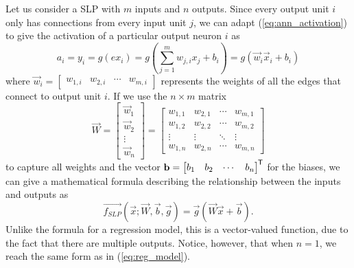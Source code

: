 Let us consider a SLP with $m$ inputs and $n$ outputs. 
Since every output unit $i$ only has connections from every input unit $j$,
we can adapt (\ref{eq:ann_activation}) to give the activation of a particular output neuron $i$ as
\begin{equation}
    a_i = y_i = g\left({ex}_i\right) = g\left(\sum_{j=1}^m{w_{j,i} x_j} + b_i\right)
    = g\left( \vec{w}_i \vec{x}_i + b_i\right)
\end{equation}
where
$
    \vec{w}_i = \begin{bmatrix}
        w_{1,i} & w_{2,i} & \cdots & w_{m,i}
    \end{bmatrix}
$
represents the weights of all the edges that connect to output unit $i$.
If we use the $n \times m$ matrix
\begin{equation}
    \vec{W} = \begin{bmatrix}
        \vec{w}_1 \\ \vec{w}_2 \\ \vdots \\ \vec{w}_n
    \end{bmatrix} = \begin{bmatrix}
        w_{1,1} & w_{2,1} & \cdots & w_{m,1} \\
        w_{1,2} & w_{2,2} & \cdots & w_{m,2} \\
        \vdots & \vdots & \ddots & \vdots \\
        w_{1,n} & w_{2,n} & \cdots & w_{m,n}
    \end{bmatrix}
\end{equation}
to capture all weights and the vector $\mathbf{b} = \begin{bmatrix}
    b_1 & b_2 & \cdots & b_n
\end{bmatrix}^{\mkern-1.5mu\mathsf{T}}$ for the biases, we can give a mathematical formula describing the relationship between the inputs and outputs as
\begin{equation}
    \label{eq:single_layer_perceptron}
    \vec{f_{SLP}}(\vec{x}; \vec{W}, \vec{b}, \vec{g}) = \vec{g}\left( \vec{W} \vec{x} + \vec{b} \right).
\end{equation}
Unlike the formula for a regression model, this is a vector-valued function, due to the fact that there are multiple outputs. 
Notice, however, that when $n=1$, we reach the same form as in (\ref{eq:reg_model}). 

